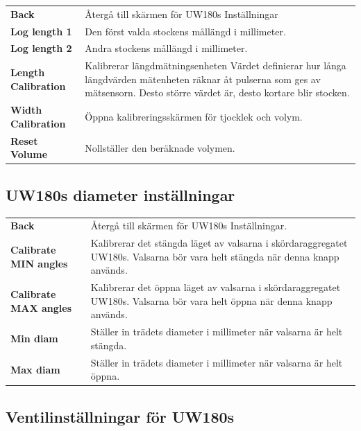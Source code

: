 \documentclass[12pt,a4paper,finnish]{uvmanual}
\begin{document}

\begin{tabular}{ L{0.2\textwidth} L{0.66\textwidth} }
\textbf{Back} & Återgå till skärmen för UW180s Inställningar \\
\textbf{Log length 1} & Den först valda stockens mållängd i millimeter. \\
\textbf{Log length 2} & Andra stockens mållängd i millimeter. \\
\textbf{Length Calibration} & Kalibrerar längdmätningsenheten Värdet definierar hur långa längdvärden mätenheten räknar åt pulserna som ges av mätsensorn. Desto större värdet är, desto kortare blir stocken. \\
\textbf{Width Calibration} & Öppna kalibreringsskärmen för tjocklek och volym. \\
\textbf{Reset Volume} & Nollställer den beräknade volymen. \\
\end{tabular}

\FloatBarrier
\subsection{UW180s diameter inställningar}\label{ch:settings_uw180s_width}


\begin{tabular}{ L{0.2\textwidth} L{0.66\textwidth} }
\textbf{Back} & Återgå till skärmen för UW180s Inställningar. \\
\textbf{Calibrate MIN angles} & Kalibrerar det stängda läget av valsarna i skördaraggregatet UW180s.  Valsarna bör vara helt stängda när denna knapp används. \\
\textbf{Calibrate MAX angles} & Kalibrerar det öppna läget av valsarna i skördaraggregatet UW180s. Valsarna bör vara helt öppna när denna knapp används. \\
\textbf{Min diam} & Ställer in trädets diameter i millimeter när valsarna är helt stängda. \\
\textbf{Max diam} & Ställer in trädets diameter i millimeter när valsarna är helt öppna. \\
\end{tabular}



\FloatBarrier
\subsection{Ventilinställningar för UW180s}\label{ch:settings_uw180s_valves}
\end{document}
